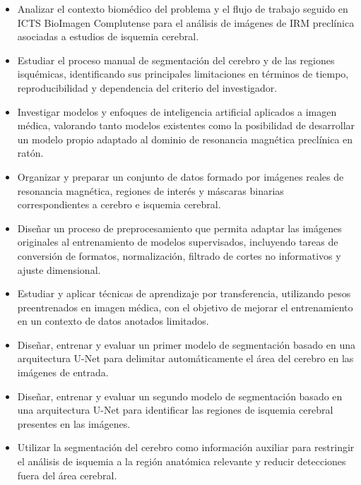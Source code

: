 \begin{itemize}
    \item[\textbf{O1.}] Analizar el contexto biomédico del problema y el flujo de trabajo seguido en ICTS BioImagen Complutense para el análisis de imágenes de IRM preclínica asociadas a estudios de isquemia cerebral.

    \item[\textbf{O2.}] Estudiar el proceso manual de segmentación del cerebro y de las regiones isquémicas, identificando sus principales limitaciones en términos de tiempo, reproducibilidad y dependencia del criterio del investigador.

    \item[\textbf{O3.}] Investigar modelos y enfoques de inteligencia artificial aplicados a imagen médica, valorando tanto modelos existentes como la posibilidad de desarrollar un modelo propio adaptado al dominio de resonancia magnética preclínica en ratón.

    \item[\textbf{O4.}] Organizar y preparar un conjunto de datos formado por imágenes reales de resonancia magnética, regiones de interés y máscaras binarias correspondientes a cerebro e isquemia cerebral.

    \item[\textbf{O5.}] Diseñar un proceso de preprocesamiento que permita adaptar las imágenes originales al entrenamiento de modelos supervisados, incluyendo tareas de conversión de formatos, normalización, filtrado de cortes no informativos y ajuste dimensional.

    \item[\textbf{O6.}] Estudiar y aplicar técnicas de aprendizaje por transferencia, utilizando pesos preentrenados en imagen médica, con el objetivo de mejorar el entrenamiento en un contexto de datos anotados limitados.

    \item[\textbf{O7.}] Diseñar, entrenar y evaluar un primer modelo de segmentación basado en una arquitectura U-Net para delimitar automáticamente el área del cerebro en las imágenes de entrada.

    \item[\textbf{O8.}] Diseñar, entrenar y evaluar un segundo modelo de segmentación basado en una arquitectura U-Net para identificar las regiones de isquemia cerebral presentes en las imágenes.

    \item[\textbf{O9.}] Utilizar la segmentación del cerebro como información auxiliar para restringir el análisis de isquemia a la región anatómica relevante y reducir detecciones fuera del área cerebral.


\end{itemize}
